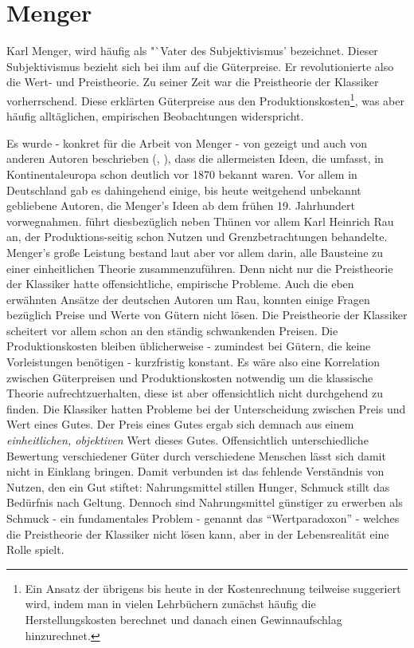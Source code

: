 \section{Menger}
\label{Wiener Schule}

Karl Menger, wird häufig als "`Vater des Subjektivismus' bezeichnet. Dieser Subjektivismus bezieht sich bei ihm auf die Güterpreise. Er revolutionierte also die Wert- und Preistheorie. Zu seiner Zeit war die Preistheorie der Klassiker vorherrschend. Diese erklärten Güterpreise aus den Produktionskosten\footnote{Ein Ansatz der übrigens bis heute in der Kostenrechnung teilweise suggeriert wird, indem man in vielen Lehrbüchern zunächst häufig die Herstellungskosten berechnet und danach einen Gewinnaufschlag hinzurechnet.}, was aber häufig alltäglichen, empirischen Beobachtungen widerspricht. 

Es wurde - konkret für die Arbeit von Menger - von \textcite{Streissler1990} gezeigt und auch von anderen Autoren beschrieben (\textcite{Blaug1973}, \textcite{Ekelund2002}), dass die allermeisten Ideen, die \textcite{Menger1871} umfasst, in Kontinentaleuropa schon deutlich vor 1870 bekannt waren. Vor allem in Deutschland gab es dahingehend einige, bis heute weitgehend unbekannt gebliebene Autoren, die Menger's Ideen ab dem frühen 19. Jahrhundert vorwegnahmen. \textcite[S. 159]{Blaug2001} führt diesbezüglich neben Thünen vor allem Karl Heinrich Rau an, der  Produktions-seitig schon Nutzen und Grenzbetrachtungen behandelte. Menger's große Leistung bestand laut \textcite[S. 295]{Rosner2012} aber vor allem darin, alle Bausteine zu einer einheitlichen Theorie zusammenzuführen. Denn nicht nur die Preistheorie der Klassiker hatte offensichtliche, empirische Probleme. Auch die eben erwähnten Ansätze der deutschen Autoren um Rau, konnten einige Fragen bezüglich Preise und Werte von Gütern nicht lösen. Die Preistheorie der Klassiker scheitert vor allem schon an den ständig schwankenden Preisen. Die Produktionskosten bleiben üblicherweise - zumindest bei Gütern, die keine Vorleistungen benötigen - kurzfristig konstant. Es wäre also eine Korrelation zwischen Güterpreisen und Produktionskosten notwendig um die klassische Theorie aufrechtzuerhalten, diese ist aber offensichtlich nicht durchgehend zu finden. Die Klassiker hatten Probleme bei der Unterscheidung zwischen Preis und Wert eines Gutes. Der Preis eines Gutes ergab sich demnach aus einem \textit{einheitlichen, objektiven} Wert dieses Gutes. Offensichtlich unterschiedliche Bewertung verschiedener Güter durch verschiedene Menschen lässt sich damit nicht in Einklang bringen. Damit verbunden ist das fehlende Verständnis von Nutzen, den ein Gut stiftet: Nahrungsmittel stillen Hunger, Schmuck stillt das Bedürfnis nach Geltung. Dennoch sind Nahrungsmittel günstiger zu erwerben als Schmuck - ein fundamentales Problem - genannt das "`Wertparadoxon"' - welches die Preistheorie der Klassiker nicht lösen kann, aber in der Lebensrealität eine Rolle spielt.

